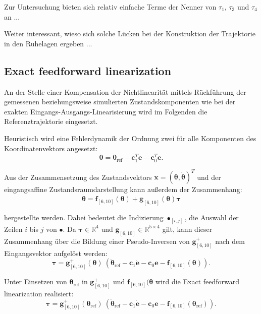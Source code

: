 Zur Untersuchung bieten sich relativ einfache Terme der Nenner von $\tau_1$, $\tau_3$ und $\tau_4$ an ...

Weiter interessant, wieso sich solche Lücken bei der Konstruktion der Trajektorie in den Ruhelagen ergeben ...

\subsection{Exact feedforward linearization}
An der Stelle einer Kompensation der Nichtlinearität mittels Rückführung der gemessenen beziehungsweise simulierten Zustandskomponenten wie bei der exakten Eingangs-Ausgangs-Linearisierung wird im Folgenden die Referenztrajektorie eingesetzt. \cite{Hagenmeyer2003}

Heuristisch wird eine Fehlerdynamik der Ordnung zwei für alle Komponenten des Koordinatenvektors angesetzt:
\begin{equation}
	\ddot{\pmb{\theta}} = \ddot{\pmb{\theta}}_{\text{ref}} - \pmb{c}_1^T \dot{\pmb{e}} - \pmb{c}_0^T \pmb{e}.
\end{equation}

Aus der Zusammensetzung des Zustandsvektors $\pmb{x} = (\pmb{\theta}, \dot{\pmb{\theta}})^T$ und der eingangsaffine Zustandsraumdarstellung kann außerdem der Zusammenhang:
\begin{equation}
	\ddot{\pmb{\theta}} = \pmb{f}_{[6, 10]}(\pmb{\theta}) + \pmb{g}_{[6, 10]}(\pmb{\theta}) \pmb{\tau}
\end{equation}

hergestellte werden. Dabei bedeutet die Indizierung $\bullet_{[i, j]}$, die Auswahl der Zeilen $i$ bis $j$ von $\bullet$. Da $\pmb{\tau} \in \mathbb{R}^4$ und $\pmb{g}_{[6, 10]} \in \mathbb{R}^{5 \times 4}$ gilt, kann dieser Zusammenhang über die Bildung einer Pseudo-Inversen von $\pmb{g}_{[6, 10]}^+$ nach dem Eingangsvektor aufgelöst werden:
\begin{equation}
	\pmb{\tau}= \pmb{g}^{+}_{[6, 10]} (\pmb{\theta}) \ (\ddot{\pmb{\theta}}_{\text{ref}} - \pmb{c}_{1} \pmb{\dot{e}} - \pmb{c}_{0} \pmb{e} - \pmb{f}_{[6, 10]}(\pmb{\theta})).
\end{equation} 

Unter Einsetzen von $\pmb{\theta}_{\text{ref}}$ in $\pmb{g}_{[6, 10]}^+$ und $\pmb{f}_{[6, 10]}(\pmb{\theta}$ wird die Exact feedforward linearization realisiert:
\begin{equation}
\pmb{\tau}= \pmb{g}^{+}_{[6, 10]} (\pmb{\theta}_{\text{ref}}) \ (\ddot{\pmb{\theta}}_{\text{ref}} - \pmb{c}_{1} \pmb{\dot{e}} - \pmb{c}_{0} \pmb{e} - \pmb{f}_{[6, 10]}(\pmb{\theta}_{\text{ref}})).
\end{equation} 

